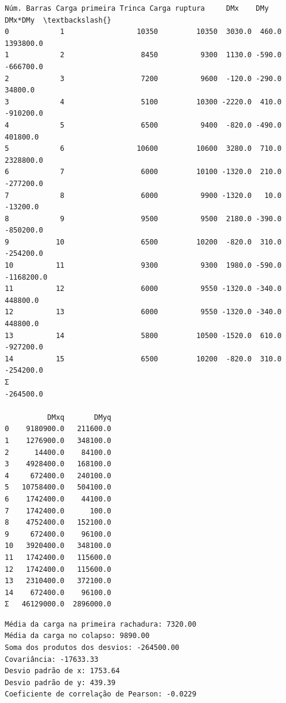 \documentclass[11pt]{article}
\begin{document}
    
    \begin{Verbatim}[commandchars=\\\{\}]
   Núm. Barras Carga primeira Trinca Carga ruptura     DMx    DMy    DMx*DMy  \textbackslash{}
0            1                 10350         10350  3030.0  460.0  1393800.0   
1            2                  8450          9300  1130.0 -590.0  -666700.0   
2            3                  7200          9600  -120.0 -290.0    34800.0   
3            4                  5100         10300 -2220.0  410.0  -910200.0   
4            5                  6500          9400  -820.0 -490.0   401800.0   
5            6                 10600         10600  3280.0  710.0  2328800.0   
6            7                  6000         10100 -1320.0  210.0  -277200.0   
7            8                  6000          9900 -1320.0   10.0   -13200.0   
8            9                  9500          9500  2180.0 -390.0  -850200.0   
9           10                  6500         10200  -820.0  310.0  -254200.0   
10          11                  9300          9300  1980.0 -590.0 -1168200.0   
11          12                  6000          9550 -1320.0 -340.0   448800.0   
12          13                  6000          9550 -1320.0 -340.0   448800.0   
13          14                  5800         10500 -1520.0  610.0  -927200.0   
14          15                  6500         10200  -820.0  310.0  -254200.0   
Σ                                                                  -264500.0   

          DMxq       DMyq  
0    9180900.0   211600.0  
1    1276900.0   348100.0  
2      14400.0    84100.0  
3    4928400.0   168100.0  
4     672400.0   240100.0  
5   10758400.0   504100.0  
6    1742400.0    44100.0  
7    1742400.0      100.0  
8    4752400.0   152100.0  
9     672400.0    96100.0  
10   3920400.0   348100.0  
11   1742400.0   115600.0  
12   1742400.0   115600.0  
13   2310400.0   372100.0  
14    672400.0    96100.0  
Σ   46129000.0  2896000.0  
    \end{Verbatim}

    
    \begin{Verbatim}[commandchars=\\\{\}]
Média da carga na primeira rachadura: 7320.00
Média da carga no colapso: 9890.00
Soma dos produtos dos desvios: -264500.00
Covariância: -17633.33
Desvio padrão de x: 1753.64
Desvio padrão de y: 439.39
Coeficiente de correlação de Pearson: -0.0229
    \end{Verbatim}

    \begin{center}
    \end{center}
    { \hspace*{\fill} \\}
    
\end{document}
